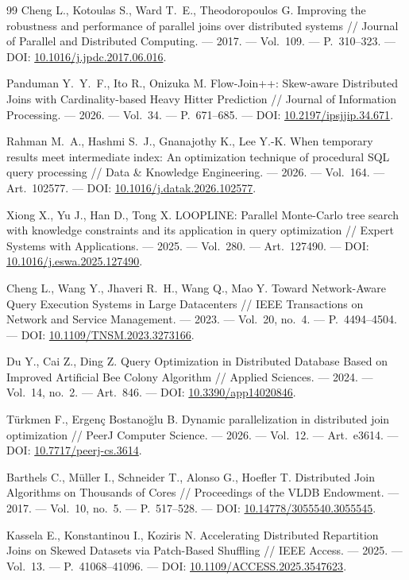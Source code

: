 \documentclass[a4paper, final]{article}
\begin{document}
\begin{thebibliography}{99}
		Cheng L., Kotoulas S., Ward T.~E., Theodoropoulos G.
		Improving the robustness and performance of parallel joins over distributed systems //
		Journal of Parallel and Distributed Computing. ---
		2017. --- Vol.~109. --- P.~310--323. ---
		DOI: \href{https://doi.org/10.1016/j.jpdc.2017.06.016}{10.1016/j.jpdc.2017.06.016}.
		
		Panduman Y.~Y.~F., Ito R., Onizuka M.
		Flow-Join++: Skew-aware Distributed Joins with Cardinality-based
		Heavy Hitter Prediction //
		Journal of Information Processing. ---
		2026. --- Vol.~34. --- P.~671--685. ---
		DOI: \href{https://doi.org/10.2197/ipsjjip.34.671}{10.2197/ipsjjip.34.671}.
		
		Rahman M.~A., Hashmi S.~J., Gnanajothy K., Lee Y.-K.
		When temporary results meet intermediate index: An optimization technique
		of procedural SQL query processing //
		Data \& Knowledge Engineering. ---
		2026. --- Vol.~164. --- Art.~102577. ---
		DOI: \href{https://doi.org/10.1016/j.datak.2026.102577}{10.1016/j.datak.2026.102577}.
		
		Xiong X., Yu J., Han D., Tong X.
		LOOPLINE: Parallel Monte-Carlo tree search with knowledge constraints and its application in query optimization //
		Expert Systems with Applications. ---
		2025. --- Vol.~280. --- Art.~127490. ---
		DOI: \href{https://doi.org/10.1016/j.eswa.2025.127490}{10.1016/j.eswa.2025.127490}.
		
		Cheng L., Wang Y., Jhaveri R.~H., Wang Q., Mao Y.
		Toward Network-Aware Query Execution Systems in Large Datacenters //
		IEEE Transactions on Network and Service Management. ---
		2023. --- Vol.~20, no.~4. --- P.~4494--4504. ---
		DOI: \href{https://doi.org/10.1109/TNSM.2023.3273166}{10.1109/TNSM.2023.3273166}.
		
		Du Y., Cai Z., Ding Z.
		Query Optimization in Distributed Database Based on Improved Artificial Bee Colony Algorithm //
		Applied Sciences. ---
		2024. --- Vol.~14, no.~2. --- Art.~846. ---
		DOI: \href{https://doi.org/10.3390/app14020846}{10.3390/app14020846}.
		
		Türkmen F., Ergenç Bostanoğlu B.
		Dynamic parallelization in distributed join optimization //
		PeerJ Computer Science. ---
		2026. --- Vol.~12. --- Art.~e3614. ---
		DOI: \href{https://doi.org/10.7717/peerj-cs.3614}{10.7717/peerj-cs.3614}.
		
		Barthels C., Müller I., Schneider T., Alonso G., Hoefler T.
		Distributed Join Algorithms on Thousands of Cores //
		Proceedings of the VLDB Endowment. ---
		2017. --- Vol.~10, no.~5. --- P.~517--528. ---
		DOI: \href{https://doi.org/10.14778/3055540.3055545}{10.14778/3055540.3055545}.
		
		Kassela E., Konstantinou I., Koziris N.
		Accelerating Distributed Repartition Joins on Skewed Datasets
		via Patch-Based Shuffling //
		IEEE Access. ---
		2025. --- Vol.~13. --- P.~41068--41096. ---
		DOI: \href{https://doi.org/10.1109/ACCESS.2025.3547623}{10.1109/ACCESS.2025.3547623}.
	\end{thebibliography}
\end{document}
